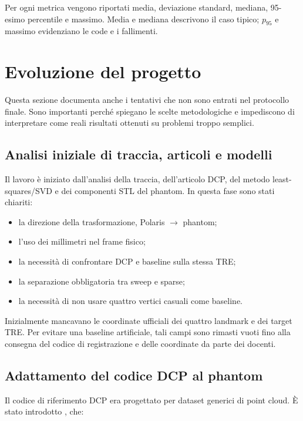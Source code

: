 \documentclass[11pt,a4paper]{article}
\newcommand{\code}[1]{\texttt{\detokenize{#1}}}
\begin{document}
Per ogni metrica vengono riportati media, deviazione standard, mediana,
95-esimo percentile e massimo. Media e mediana descrivono il caso tipico;
$p_{95}$ e massimo evidenziano le code e i fallimenti.

\section{Evoluzione del progetto}

Questa sezione documenta anche i tentativi che non sono entrati nel protocollo
finale. Sono importanti perché spiegano le scelte metodologiche e impediscono
di interpretare come reali risultati ottenuti su problemi troppo semplici.

\subsection{Analisi iniziale di traccia, articoli e modelli}

Il lavoro è iniziato dall'analisi della traccia, dell'articolo DCP, del metodo
least-squares/SVD e dei componenti STL del phantom. In questa fase sono stati
chiariti:

\begin{itemize}
    \item la direzione della trasformazione, Polaris $\rightarrow$ phantom;
    \item l'uso dei millimetri nel frame fisico;
    \item la necessità di confrontare DCP e baseline sulla stessa TRE;
    \item la separazione obbligatoria tra sweep e sparse;
    \item la necessità di non usare quattro vertici casuali come baseline.
\end{itemize}

Inizialmente mancavano le coordinate ufficiali dei quattro landmark e dei
target TRE. Per evitare una baseline artificiale, tali campi sono rimasti
vuoti fino alla consegna del codice di registrazione e delle coordinate da
parte dei docenti.

\subsection{Adattamento del codice DCP al phantom}

Il codice di riferimento DCP era progettato per dataset generici di point
cloud. È stato introdotto \code{PhantomDataset}, che:
\end{document}
